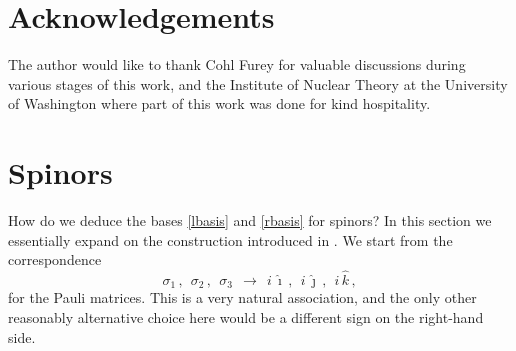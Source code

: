 \documentclass[epsfig,12pt]{article}
\newcommand{\ii}{\hat\imath}
\newcommand{\jj}{\hat\jmath}
\newcommand{\kk}{\hat k}
\begin{document}
\section*{Acknowledgements}

	The author would like to thank Cohl Furey for valuable discussions during various stages
	of this work,
	and the Institute of Nuclear Theory at the University of Washington where part of this work
	was done for kind hospitality.




\pagebreak
\appendix
\setcounter{equation}{0}


\section{Spinors}
\label{section-spinors}

	How do we deduce the bases \eqref{lbasis} and \eqref{rbasis} for spinors?
	In this section we essentially expand on the construction introduced in \cite{thesis}.
	We start from the correspondence
\begin{equation}
	\sigma_1\,,~~ \sigma_2\,,~~ \sigma_3	~~\to~~		i\,\ii\,,~~ i\,\jj\,,~~ i\,\kk\,,
\end{equation}
	for the Pauli matrices.
	This is a very natural association, and the only other reasonably alternative choice here
	would be a different sign on the right-hand side.
\end{document}
